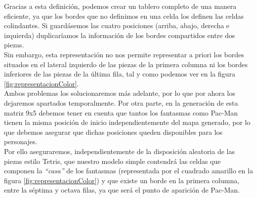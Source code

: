 Gracias a esta definición, podemos crear un tablero completo de una manera eficiente, ya que los bordes que no definimos en una celda los definen las celdas colindantes. Si guardásemos las cuatro posiciones (arriba, abajo, derecha e izquierda) duplicaríamos la información de los bordes compartidos entre dos piezas.\\

Sin embargo, esta representación no nos permite representar a priori los bordes situados en el lateral izquierdo de las piezas de la primera columna ni los bordes inferiores de las piezas de la última fila, tal y como podemos ver en la figura \ref{fig:representacionColor}.\\

Ambos problemas los solucionaremos más adelante, por lo que por ahora los dejaremos apartados temporalmente. Por otra parte, en la generación de esta matriz 9x5 debemos tener en cuenta que tantos los fantasmas como Pac-Man tienen la misma posición de inicio independientemente del mapa generado, por lo que debemos asegurar que dichas posiciones queden disponibles para los personajes.\\

Por ello aseguraremos, independientemente de la disposición aleatoria de las piezas estilo Tetris, que nuestro modelo simple contendrá las celdas que componen la \textit{``casa''} de los fantasmas (representada por el cuadrado amarillo en la figura \ref{fig:representacionColor}) y que existe un borde en la primera columna, entre la séptima y octava filas, ya que será el punto de aparición de Pac-Man.\\

